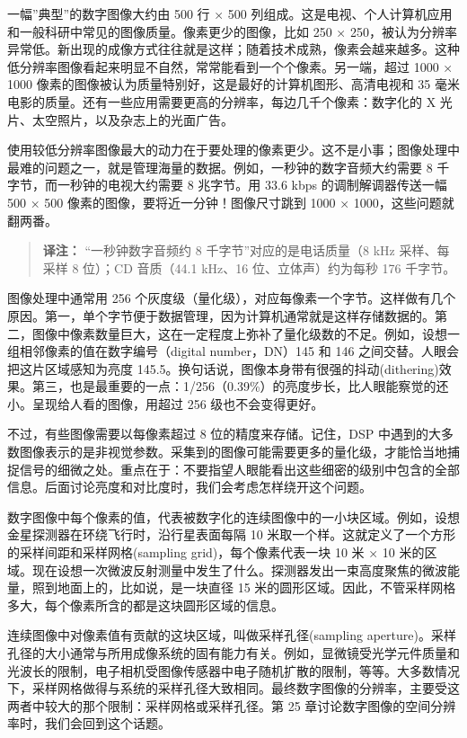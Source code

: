 一幅''典型''的数字图像大约由 500 行 × 500
列组成。这是电视、个人计算机应用和一般科研中常见的图像质量。像素更少的图像，比如
250 ×
250，被认为分辨率异常低。新出现的成像方式往往就是这样；随着技术成熟，像素会越来越多。这种低分辨率图像看起来明显不自然，常常能看到一个个像素。另一端，超过
1000 × 1000 像素的图像被认为质量特别好，这是最好的计算机图形、高清电视和
35
毫米电影的质量。还有一些应用需要更高的分辨率，每边几千个像素：数字化的 X
光片、太空照片，以及杂志上的光面广告。

使用较低分辨率图像最大的动力在于要处理的像素更少。这不是小事；图像处理中最难的问题之一，就是管理海量的数据。例如，一秒钟的数字音频大约需要
8 千字节，而一秒钟的电视大约需要 8 兆字节。用 33.6 kbps
的调制解调器传送一幅 500 × 500 像素的图像，要将近一分钟！图像尺寸跳到
1000 × 1000，这些问题就翻两番。

\begin{quote}
\textbf{译注：} ``一秒钟数字音频约 8 千字节''对应的是电话质量（8 kHz
采样、每采样 8 位）；CD 音质（44.1 kHz、16 位、立体声）约为每秒 176
千字节。
\end{quote}

图像处理中通常用 256
个灰度级（量化级），对应每像素一个字节。这样做有几个原因。第一，单个字节便于数据管理，因为计算机通常就是这样存储数据的。第二，图像中像素数量巨大，这在一定程度上弥补了量化级数的不足。例如，设想一组相邻像素的值在数字编号（digital
number，DN）145 和 146 之间交替。人眼会把这片区域感知为亮度
145.5。换句话说，图像本身带有很强的抖动(dithering)效果。第三，也是最重要的一点：1/256（0.39\%）的亮度步长，比人眼能察觉的还小。呈现给人看的图像，用超过
256 级也不会变得更好。

不过，有些图像需要以每像素超过 8 位的精度来存储。记住，DSP
中遇到的大多数图像表示的是非视觉参数。采集到的图像可能需要更多的量化级，才能恰当地捕捉信号的细微之处。重点在于：不要指望人眼能看出这些细密的级别中包含的全部信息。后面讨论亮度和对比度时，我们会考虑怎样绕开这个问题。

数字图像中每个像素的值，代表被数字化的连续图像中的一小块区域。例如，设想金星探测器在环绕飞行时，沿行星表面每隔
10 米取一个样。这就定义了一个方形的采样间距和采样网格(sampling
grid)，每个像素代表一块 10 米 × 10
米的区域。现在设想一次微波反射测量中发生了什么。探测器发出一束高度聚焦的微波能量，照到地面上的，比如说，是一块直径
15
米的圆形区域。因此，不管采样网格多大，每个像素所含的都是这块圆形区域的信息。

连续图像中对像素值有贡献的这块区域，叫做采样孔径(sampling
aperture)。采样孔径的大小通常与所用成像系统的固有能力有关。例如，显微镜受光学元件质量和光波长的限制，电子相机受图像传感器中电子随机扩散的限制，等等。大多数情况下，采样网格做得与系统的采样孔径大致相同。最终数字图像的分辨率，主要受这两者中较大的那个限制：采样网格或采样孔径。第
25 章讨论数字图像的空间分辨率时，我们会回到这个话题。

